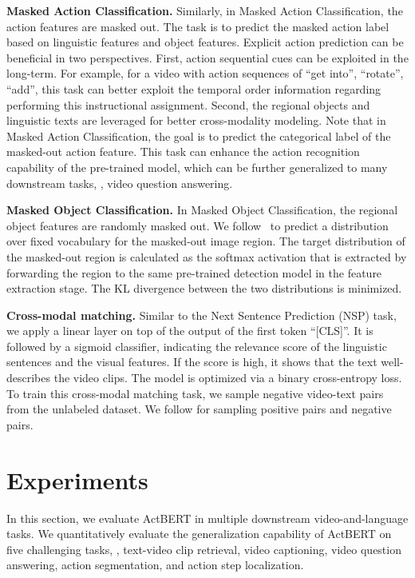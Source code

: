 \documentclass[10pt,twocolumn,letterpaper]{article}
\newcommand{\ours}{ActBERT\xspace}
\begin{document}
\noindent\textbf{Masked Action Classification.}
Similarly, in Masked Action Classification, the action features are masked out. The task is to predict the masked action label based on linguistic features and object features.
Explicit action prediction can be beneficial in two perspectives. First, action sequential cues can be exploited in the long-term. For example, for a video with action sequences of ``get into'', ``rotate'', ``add'', this task can better exploit the temporal order information regarding performing this instructional assignment.
Second, the regional objects and linguistic texts are leveraged for better cross-modality modeling. Note that in Masked Action Classification, the goal is to predict the categorical label of the masked-out action feature.
This task can enhance the action recognition capability of the pre-trained model, which can be further generalized to many downstream tasks, \eg, video question answering.

\noindent\textbf{Masked Object Classification.}
In Masked Object Classification, the regional object features are randomly masked out. We follow~\cite{lu2019vilbert} to predict a distribution over fixed vocabulary for the masked-out image region. 
The target distribution of the masked-out region is calculated as the softmax activation that is extracted by forwarding the region to the same pre-trained detection model in the feature extraction stage. The KL divergence between the two distributions is minimized.

\noindent\textbf{Cross-modal matching.}
Similar to the Next Sentence Prediction (NSP) task, we apply a linear layer on top of the output of the first token ``[CLS]''.
It is followed by a sigmoid classifier, indicating the relevance score of the linguistic sentences and the visual features. If the score is high, it shows that the text well-describes the video clips.
The model is optimized via a binary cross-entropy
loss. To train this cross-modal matching task, we sample negative video-text pairs from the unlabeled dataset. We follow \cite{miech2019howto100m} for sampling positive pairs and negative pairs.


\section{Experiments}
\label{sec:expr}
In this section, we evaluate \ours in multiple downstream video-and-language tasks.
We quantitatively evaluate the generalization capability of \ours on five challenging tasks, \ie, text-video clip retrieval, video captioning, video question answering, action segmentation, and action step localization.
\end{document}
